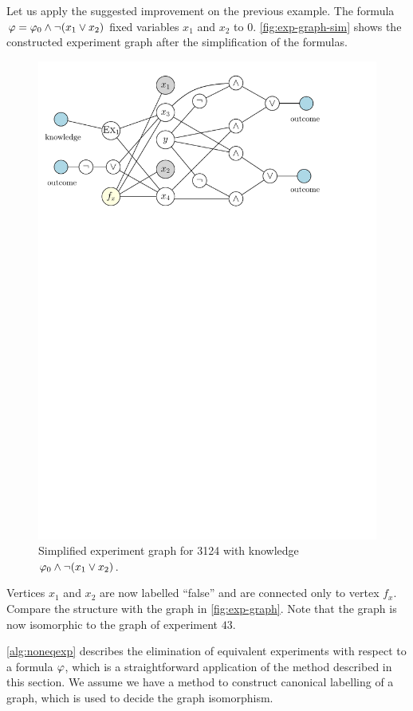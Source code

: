 \begin{example}
Let us apply the suggested improvement on the previous example.
The formula $\varphi = \varphi_0\wedge\neg(x_1\vee x_2)$ fixed variables
$x_1$ and $x_2$ to 0.
\autoref{fig:exp-graph-sim} shows the constructed experiment graph
  after the simplification of the formulas.

\begin{figure}[ht]
\begin{center}
\includegraphics[width=.7\textwidth]{pictures/exp-graph-sim.pdf}
\caption{Simplified experiment graph for 3124 with knowledge $\varphi_0\wedge\neg(x_1\vee x_2)$.}
\label{fig:exp-graph-sim}
\end{center}
\end{figure}

Vertices $x_1$ and $x_2$ are now labelled ``false'' and are connected
  only to vertex $f_x$.
Compare the structure with the graph in \autoref{fig:exp-graph}.
Note that the graph is now isomorphic to the graph of experiment $43$.\eqed
\end{example}

\autoref{alg:noneqexp} describes the elimination of equivalent experiments with respect to a formula $\varphi$,
  which is a straightforward application of the method described in this section.
We assume we have a method to construct canonical labelling of a graph,
  which is used to decide the graph isomorphism.

